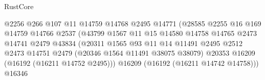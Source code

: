 \begin{lexlean}{RustCore}
\begin{coremodule}
                                                @2256
                                                @266
                                                @107
                                                @11
                                                @14759
                                                @14768
                                                @2495
                                                @14771
                                                (@28585
                                                  @2255
                                                  @16
                                                  @169
                                                  @14759
                                                  @14766
                                                  @2537
                                                  (@43799
                                                    @1567
                                                    @11
                                                    @15
                                                    @14580
                                                    @14758
                                                    @14765
                                                    @2473
                                                    @14741
                                                    @2479
                                                    @43834
                                                    (@20311
                                                      @1565
                                                      @93
                                                      @11
                                                      @14
                                                      @11491
                                                      @2495
                                                      @2512
                                                      @2473
                                                      @14751
                                                      @2479
                                                      (@20346 @1564 @11491 @38075 @38079)
                                                      @20353
                                                      @16209
                                                      (@16192 (@16211 @14752 @2495)))
                                                    @16209
                                                    (@16192 (@16211 @14742 @14758)))
                                                  @16346

\end{coremodule}
\end{lexlean}
